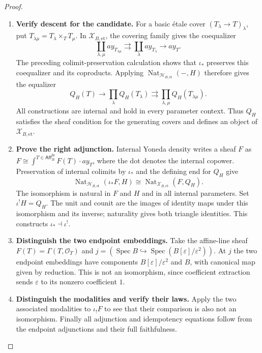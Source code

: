 \documentclass[11pt,a4paper]{article}
\numberwithin{algorithm}{section}
\numberwithin{equation}{section}
\theoremstyle{definition}
\theoremstyle{remark}
\theoremstyle{plain}
\newcommand{\OO}{\mathcal O}
\newcommand{\eps}{\varepsilon}
\newcommand{\AffB}{\mathsf{Aff}^{\mathrm{fp}}_B}
\newcommand{\BaseEt}{\mathscr X_{B,\mathrm{et}}}
\newcommand{\ThickEt}{\mathscr H_{B,\mathrm{et}}}
\theoremstyle{definition}
\theoremstyle{plain}
\begin{document}
\begin{proof}
\begin{enumerate}[leftmargin=*,align=left]
\item \textbf{Verify descent for the candidate.}
For a basic \'etale cover $(T_\lambda\to T)_\lambda$, put
$T_{\lambda\mu}=T_\lambda\times_TT_\mu$. In $\BaseEt$,
the covering family gives the coequalizer
\[
 \coprod_{\lambda,\mu}a y_{T_{\lambda\mu}}
 \rightrightarrows\coprod_\lambda a y_{T_\lambda}
 \longrightarrow a y_T.
\]
The preceding colimit-preservation calculation shows that
$\iota_*$ preserves this coequalizer and its coproducts.
Applying $\operatorname{Nat}_{\ThickEt}(-,H)$ therefore
gives the equalizer
\[
 Q_H(T)\longrightarrow\prod_\lambda Q_H(T_\lambda)
 \rightrightarrows\prod_{\lambda,\mu}Q_H(T_{\lambda\mu}).
\]
All constructions are internal and hold in every parameter
context. Thus $Q_H$ satisfies the sheaf condition for the
generating covers and defines an object of $\BaseEt$.

\item \textbf{Prove the right adjunction.}
Internal Yoneda density writes a sheaf $F$ as
$F\cong\int^{T\in\AffB}F(T)\cdot a y_T$, where the dot
denotes the internal copower. Preservation of internal
colimits by $\iota_*$ and the defining end for $Q_H$ give
\[
 \operatorname{Nat}_{\ThickEt}(\iota_*F,H)
 \cong\operatorname{Nat}_{\BaseEt}(F,Q_H).
\]
The isomorphism is natural in $F$ and $H$ and in all internal
parameters. Set $\iota^!H=Q_H$. The unit and counit are the
images of identity maps under this isomorphism and its inverse;
naturality gives both triangle identities. This constructs
$\iota_*\dashv\iota^!$.

\item \textbf{Distinguish the two endpoint embeddings.}
Take the affine-line sheaf $F(T)=\Gamma(T,\OO_T)$ and
$j=(\operatorname{Spec}B\hookrightarrow
\operatorname{Spec}(B[\eps]/\eps^2))$.  At $j$ the two
endpoint embeddings have components $B[\eps]/\eps^2$ and
$B$, with canonical map given by reduction.  This is not an
isomorphism, since coefficient extraction sends $\eps$ to
its nonzero coefficient $1$.

\item \textbf{Distinguish the modalities and verify their laws.}
Apply the two associated
modalities to $\iota_!F$ to see that their comparison is
also not an isomorphism.  Finally all adjunction and
idempotency equations follow from the endpoint adjunctions
and their full faithfulness.
\end{enumerate}
\end{proof}
\end{document}
